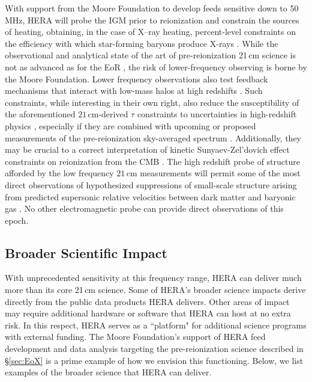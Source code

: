 \documentclass[preprint,11pt]{aastex}
\begin{document}
With support from the Moore Foundation to develop feeds sensitive down to 50\,MHz, HERA will probe the IGM prior to
reionization and constrain the sources of heating, obtaining, in the case of
X--ray heating, percent-level constraints on the efficiency with which star-forming baryons
produce X-rays \citep{ewall-wice_et_al2015}. While the observational and analytical state of the art of pre-reionization 21\,cm science is not as advanced as for the EoR \citep{ewall-wice_et_al2016-EoXLimits}, the risk of lower-frequency observing is borne by the Moore Foundation.
Lower
frequency observations also test feedback
mechanisms that interact with low-mass halos at high redshifts
\citep{Iliev_et_al2007,Iliev_et_al2012,ahn_et_al2012}.
Such constraints, while interesting in their own right, also reduce
the susceptibility of the aforementioned $21\,\textrm{cm}$-derived $\tau$
constraints to uncertainties in high-redshift physics \citep{liu_et_al2015}, especially if they are 
combined with upcoming or proposed measurements of 
the pre-reionization sky-averaged spectrum \citep{fialkov_and_loeb2016}. Additionally, they may be crucial to a correct
interpretation of kinetic Sunyaev-Zel'dovich effect constraints on reionization
from the CMB \citep{park_et_al2013}. The high redshift probe of
structure afforded by the low frequency $21\,\textrm{cm}$ measurements will
permit some of the most direct observations of hypothesized suppressions of
small-scale structure
\citep{dalal_et_al2010,tseliakhovich_et_al2011,fialkov_et_al2012} arising from
predicted supersonic relative velocities between dark matter and baryonic gas
\citep{tseliakhovich_and_hirata2010}. No other electromagnetic probe can provide direct observations of this
epoch. 


\vspace{-20pt}
\subsection{Broader Scientific Impact}
\label{subsec:broader_science}
\vspace{-5pt}


\noindent With unprecedented sensitivity at this frequency range, HERA can deliver much more than its core 21\,cm science. 
Some of HERA's broader science impacts derive directly from the public data products HERA delivers.  Other
areas of impact may require additional hardware or software that HERA can host at no extra risk. 
In this respect, HERA serves as a ``platform" for additional science programs with external funding.
The Moore Foundation's support of HERA feed development and data analysis targeting the pre-reionization science described in \S\ref{sec:EoX}
is a prime example of how we envision this functioning.
Below, we list examples of the broader science that HERA can deliver.
\end{document}
